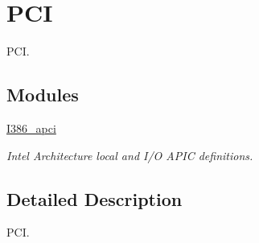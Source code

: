 \hypertarget{group__i386__pci}{}\section{P\+CI}
\label{group__i386__pci}


P\+CI.  


\subsection*{Modules}
\begin{DoxyCompactItemize}
\item 
\mbox{\hyperlink{group__i386__apci}{I386\+\_\+apci}}
\begin{DoxyCompactList}\small\item\em Intel Architecture local and I/O A\+P\+IC definitions. \end{DoxyCompactList}\end{DoxyCompactItemize}


\subsection{Detailed Description}
P\+CI. 

